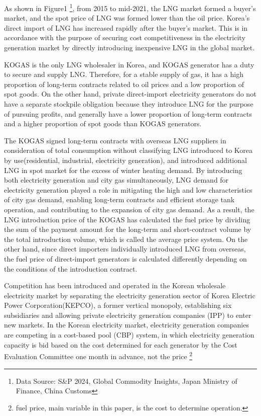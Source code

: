 \documentclass[12pt]{article}
\begin{document}
As shown in Figure1 \footnote{Data Source: S\&P 2024, Global Commodity Insights, Japan Ministry of Finance, China Customs}, from 2015 to mid-2021, the LNG market formed a buyer's market, and the spot price of LNG was formed lower than the oil price. Korea's direct import of LNG has increased rapidly after the buyer's market. This is in accordance with the purpose of securing cost competitiveness in the electricity generation market by directly introducing inexpensive LNG in the global market.




KOGAS is the only LNG wholesaler in Korea, and KOGAS generator has a duty to secure and supply LNG. Therefore, for a stable supply of gas, it has a high proportion of long-term contracts related to oil prices and a low proportion of spot goods. On the other hand, private direct-import electricity generators do not have a separate stockpile obligation because they introduce LNG for the purpose of pursuing profits, and generally have a lower proportion of long-term contracts and a higher proportion of spot goods than KOGAS generators.

The KOGAS signed long-term contracts with overseas LNG suppliers in consideration of total consumption without classifying LNG introduced to Korea by use(residential, industrial, electricity generation), and introduced additional  LNG in spot market for the excess of winter heating demand. By introducing both electricity generation and city gas simultaneously, LNG demand for electricity generation played a role in mitigating the high and low characteristics of city gas demand, enabling long-term contracts and efficient storage tank operation, and contributing to the expansion of city gas demand. As a result, the LNG introduction price of the KOGAS has calculated the fuel price by dividing the sum of the payment amount for the long-term and short-contract volume by the total introduction volume, which is called the average price system. On the other hand, since direct importers individually introduced LNG from overseas, the fuel price of direct-import generators is calculated differently depending on the conditions of the introduction contract.


Competition has been introduced and operated in the Korean wholesale electricity market by separating the electricity generation sector of Korea Electric Power Corporation(KEPCO), a former vertical monopoly, establishing six subsidiaries and allowing private electricity generation companies (IPP) to enter new markets. In the Korean electricity market, electricity generation companies are competing in a cost-based pool (CBP) system, in which electricity generation capacity is bid based on the cost determined for each generator by the Cost Evaluation Committee one month in advance, not the price \footnote{fuel price, main variable in this paper, is the cost to determine operation.} 
\end{document}
